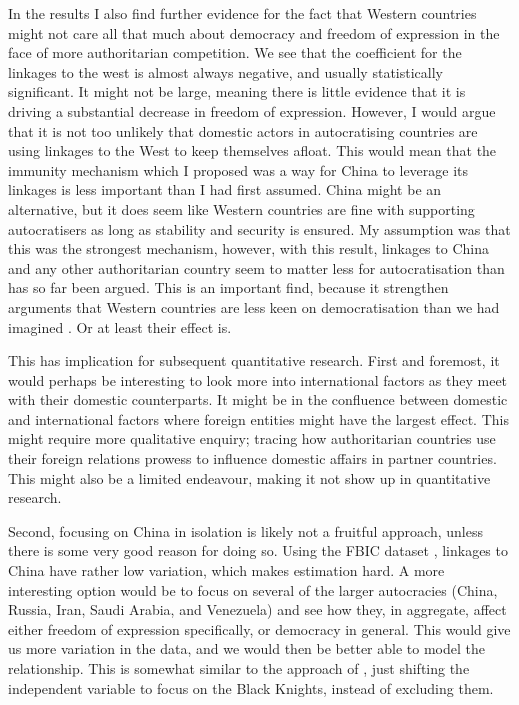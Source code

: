 In the results I also find further evidence for the fact that Western countries might not care all that much about democracy and freedom of expression in the face of more authoritarian competition. We see that the coefficient for the linkages to the west is almost always negative, and usually statistically significant. It might not be large, meaning there is little evidence that it is driving a substantial decrease in freedom of expression. However, I would argue that it is not too unlikely that domestic actors in autocratising countries are using linkages to the West to keep themselves afloat. This would mean that the immunity mechanism which I proposed was a way for China to leverage its linkages is less important than I had first assumed. China might be an alternative, but it does seem like Western countries are fine with supporting autocratisers as long as stability and security is ensured. My assumption was that this was the strongest mechanism, however, with this result, linkages to China and any other authoritarian country seem to matter less for autocratisation than has so far been argued. This is an important find, because it strengthen arguments that Western countries are less keen on democratisation than we had imagined \citep{borzel_noble_2015, delcour_spoiler_2015, freyburg_local_2015, risse_democracy_2015}. Or at least their effect is. 

This has implication for subsequent quantitative research. First and foremost, it would perhaps be interesting to look more into international factors as they meet with their domestic counterparts. It might be in the confluence between domestic and international factors where foreign entities might have the largest effect. This might require more qualitative enquiry; tracing how authoritarian countries use their foreign relations prowess to influence domestic affairs in partner countries. This might also be a limited endeavour, making it not show up in quantitative research. 

Second, focusing on China in isolation is likely not a fruitful approach, unless there is some very good reason for doing so. Using the FBIC dataset \citep{moyer_china-us_2021}, linkages to China have rather low variation, which makes estimation hard. A more interesting option would be to focus on several of the larger autocracies (China, Russia, Iran, Saudi Arabia, and Venezuela) and see how they, in aggregate, affect either freedom of expression specifically, or democracy in general. This would give us more variation in the data, and we would then be better able to model the relationship. This is somewhat similar to the approach of \citet{tansey_ties_2017}, just shifting the independent variable to focus on the Black Knights, instead of excluding them. 

